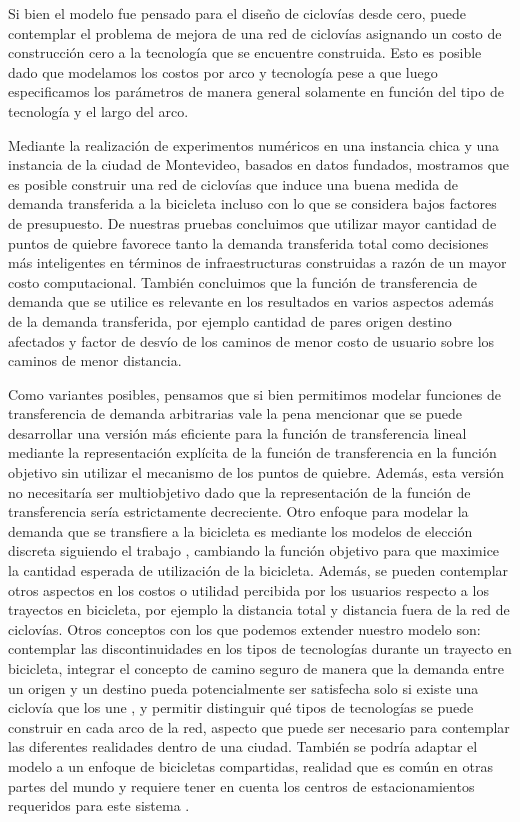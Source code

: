 Si bien el modelo fue pensado para el diseño de ciclovías desde cero, puede contemplar el problema de mejora de una red de ciclovías asignando un costo de construcción cero a la tecnología que se encuentre construida. Esto es posible dado que modelamos los costos por arco y tecnología pese a que luego especificamos los parámetros de manera general solamente en función del tipo de tecnología y el largo del arco.

Mediante la realización de experimentos numéricos en una instancia chica y una instancia de la ciudad de Montevideo, basados en datos fundados, mostramos que es posible construir una red de ciclovías que induce una buena medida de demanda transferida a la bicicleta incluso con lo que se considera bajos factores de presupuesto. De nuestras pruebas concluimos que utilizar mayor cantidad de puntos de quiebre favorece tanto la demanda transferida total como decisiones más inteligentes en términos de infraestructuras construidas a razón de un mayor costo computacional. También concluimos que la función de transferencia de demanda que se utilice es relevante en los resultados en varios aspectos además de la demanda transferida, por ejemplo cantidad de pares origen destino afectados y factor de desvío de los caminos de menor costo de usuario sobre los caminos de menor distancia.

Como variantes posibles, pensamos que si bien permitimos modelar funciones de transferencia de demanda arbitrarias vale la pena mencionar que se puede desarrollar una versión más eficiente para la función de transferencia lineal mediante la representación explícita de la función de transferencia en la función objetivo sin utilizar el mecanismo de los puntos de quiebre. Además, esta versión no necesitaría ser multiobjetivo dado que la representación de la función de transferencia sería estrictamente decreciente. Otro enfoque para modelar la demanda que se transfiere a la bicicleta es mediante los modelos de elección discreta siguiendo el trabajo \textcite{Pacheco2021}, cambiando la función objetivo para que maximice la cantidad esperada de utilización de la bicicleta. Además, se pueden contemplar otros aspectos en los costos o utilidad percibida por los usuarios respecto a los trayectos en bicicleta, por ejemplo la distancia total y distancia fuera de la red de ciclovías. Otros conceptos con los que podemos extender nuestro modelo son: contemplar las discontinuidades en los tipos de tecnologías \parencite{baya2021} durante un trayecto en bicicleta, integrar el concepto de camino seguro de manera que la demanda entre un origen y un destino pueda potencialmente ser satisfecha solo si existe una ciclovía que los une \parencite{Duthie2014}, y permitir distinguir qué tipos de tecnologías se puede construir en cada arco de la red, aspecto que puede ser necesario para contemplar las diferentes realidades dentro de una ciudad. También se podría adaptar el modelo a un enfoque de bicicletas compartidas, realidad que es común en otras partes del mundo y requiere tener en cuenta los centros de estacionamientos requeridos para este sistema \parencite{vogel2016}.

